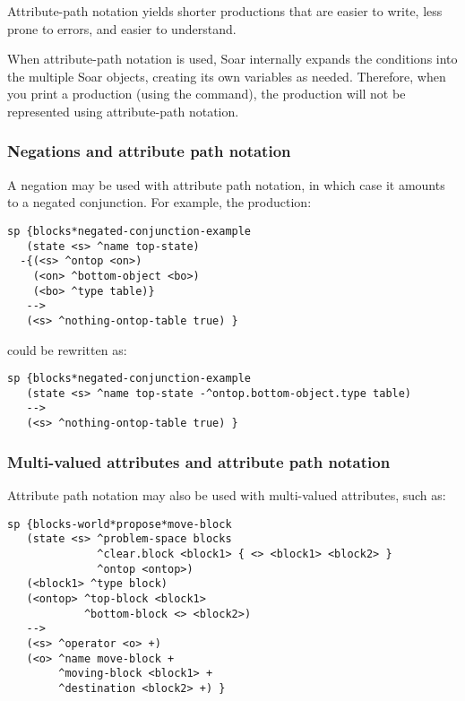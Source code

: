 Attribute-path notation yields shorter productions that are easier to
write, less prone to errors, and easier to understand.

When attribute-path notation is used, Soar internally expands the conditions
into the multiple Soar objects, creating its own variables as needed.
Therefore, when you print a production (using the  command), the
production will not be represented using attribute-path notation.


\subsubsection*{Negations and attribute path notation}


A negation may be used with attribute path notation, in which case it amounts
to a negated conjunction. For example, the production:

\begin{verbatim}
sp {blocks*negated-conjunction-example
   (state <s> ^name top-state)
  -{(<s> ^ontop <on>)
    (<on> ^bottom-object <bo>)
    (<bo> ^type table)}
   -->
   (<s> ^nothing-ontop-table true) } 
\end{verbatim}

could be rewritten as:

\begin{verbatim}
sp {blocks*negated-conjunction-example
   (state <s> ^name top-state -^ontop.bottom-object.type table)
   -->
   (<s> ^nothing-ontop-table true) }
\end{verbatim}


\subsubsection*{Multi-valued attributes and attribute path notation}


Attribute path notation may also be used with multi-valued attributes, such as:

\begin{verbatim}
sp {blocks-world*propose*move-block
   (state <s> ^problem-space blocks
              ^clear.block <block1> { <> <block1> <block2> }
              ^ontop <ontop>)
   (<block1> ^type block)
   (<ontop> ^top-block <block1>
            ^bottom-block <> <block2>)
   -->
   (<s> ^operator <o> +)
   (<o> ^name move-block +
        ^moving-block <block1> +
        ^destination <block2> +) }
\end{verbatim}


